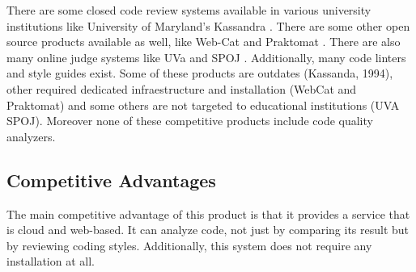 There are some closed code review systems available in various university
institutions like University of Maryland's Kassandra \cite{Matt1994}. There are
some other open source products available as well, like Web-Cat \cite{WebCat}
and Praktomat \cite{Praktomat}. There are also many online judge systems like
UVa \cite{UVA} and SPOJ \cite{SPOJ}. Additionally, many code linters and style
guides exist. Some of these products are outdates (Kassanda, 1994), other
required dedicated infraestructure and installation (WebCat and Praktomat) and
some others are not targeted to educational institutions (UVA SPOJ). Moreover
none of these competitive products include code quality analyzers.

\subsection{Competitive Advantages}

The main competitive advantage of this product is that it provides a service
that is cloud and web-based. It can analyze code, not just by comparing its
result but by reviewing coding styles. Additionally, this system does not
require any installation at all.
